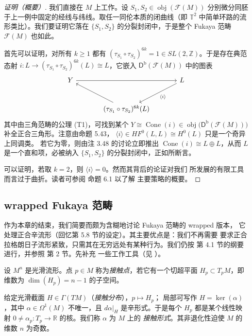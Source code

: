 \begin{proof}[证明（概要）]
我们直接在 $M$ 上工作。设 $S_1,S_2\in\operatorname{obj}(\mathcal F(M))$
分别微分同胚于上一例中固定的经线与纬线。取任一同伦本质的闭曲线（即
$\mathbb T^2$ 中简单环路的流形类比）。我们要证明它落在 $\{S_1,S_2\}$
的分裂封闭中，于是整个 Fukaya 范畴 $\mathcal F(M)$ 也如此。

首先可以证明，对所有 $k\ge1$ 都有
$(\tau_{S_1}\circ\tau_{S_2})^{6k}=1\in SL(2,\mathbb Z)$。于是存在典范
态射 $i:L\to(\tau_{S_1}\circ\tau_{S_2})^{6k}(L)\cong L$，它嵌入
$\mathsf D^{\mathrm b}(\mathcal F(M))$ 中的图表
\[
\begin{tikzcd}[row sep=2.6em, column sep=3.6em]
Y \arrow[rr] & & L \arrow[dl, "\langle i\rangle"] \\
& (\tau_{S_1}\circ\tau_{S_2})^{6k}(L) \arrow[ul] &
\end{tikzcd}
\]
其中由三角范畴的公理 (T1)，可找到某个
$Y\cong\operatorname{Cone}(i)\in\operatorname{obj}\bigl(\mathsf D^{\mathrm b}
(\mathcal F(M))\bigr)$ 补全正合三角形。注意由命题 5.43，
$\langle i\rangle\in HF^0(L,L)\cong H^0(L)$ 只是一个奇异上同调类。
若它为零，则由注 3.48 的讨论立即推出
$\operatorname{Cone}(i)\cong L\oplus L$，从而 $L$ 是一个直和项，必被纳入
$\{S_1,S_2\}$ 的分裂封闭中，正如所断言。

可以证明，若取 $k=2$，则 $\langle i\rangle=0$。然而其背后的论证对我们
所发展的有限工具而言过于曲折。读者可参阅 \cite{AS09} 命题 6.1 以了解
主要策略的概要。
\end{proof}


\subsection{wrapped Fukaya 范畴}\label{sec:6.5}

作为本章的结束，我们简要而颇为含糊地讨论 Fukaya 范畴的 wrapped 版本，
它处理正合辛流形（回忆第 5.8 节的设定）。其主要优点是：我们不再需要
要求正合拉格朗日子流形紧致，只需其在无穷远处有某种行为。我们仍按
\cite{Aur13} 第 4.1 节的纲要进行，并参照 \cite{Abo10} 第 2 节。先补充
一些工作工具（见 \cite{Sil12}）。

\begin{Def}\label{def:6.32}
设 $M^n$ 是光滑流形。点 $p\in M$ 称为\emph{接触点}，若它有一个切超平面
$H_p\subset T_pM$，即维数为 $\dim(H_p)=n-1$ 的子空间。

给定光滑截面 $H\in\Gamma(TM)$（\emph{接触分布}），$p\mapsto H_p$；
局部可写作 $H=\ker(\alpha)$，其中 $\alpha\in\Omega^1(M)$ 不唯一，且
$d\alpha|_H$ 是辛形式。于是每个 $H_p$ 都是某个线性映射
$0\neq\alpha_p:T_p\to\mathbb R$ 的核。我们称 $\alpha$ 为 $M$ 上的
\emph{接触形式}。其非退化性迫使 $M$ 的维数 $n$ 为奇数。
\end{Def}

